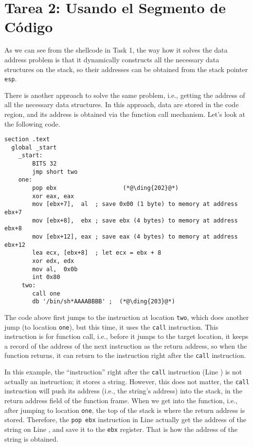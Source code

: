 \section{Tarea 2: Usando el Segmento de Código}

As we can see from the shellcode in Task 1, 
the way how it solves the data address problem is that 
it dynamically constructs all the necessary 
data structures on the stack,
so their addresses can be obtained from the 
stack pointer \texttt{esp}.

There is another approach to solve the same problem,
i.e., getting the address of all the necessary
data structures. In this approach, data are stored in the code
region, and its address is obtained 
via the function call mechanism. Let's look at the following
code. 

\begin{lstlisting}[caption={\texttt{mysh2.s}}]
section .text
  global _start
    _start:
        BITS 32
        jmp short two
    one:
        pop ebx                   (*@\ding{202}@*)
        xor eax, eax
        mov [ebx+7],  al  ; save 0x00 (1 byte) to memory at address ebx+7
        mov [ebx+8],  ebx ; save ebx (4 bytes) to memory at address ebx+8
        mov [ebx+12], eax ; save eax (4 bytes) to memory at address ebx+12
        lea ecx, [ebx+8]  ; let ecx = ebx + 8
        xor edx, edx
        mov al,  0x0b
        int 0x80
     two:
        call one
        db '/bin/sh*AAAABBBB' ;  (*@\ding{203}@*)
\end{lstlisting}

The code above first jumps to the instruction at 
location \texttt{two}, which does another 
jump (to location \texttt{one}), but this time,
it uses the \texttt{call} instruction.  This instruction 
is for function call, i.e., before it jumps to
the target location, it keeps a record of the address
of the next instruction as the return address, so when
the function returns, it can return to the 
instruction right after the \texttt{call} instruction.  

In this example, the ``instruction'' right after the 
\texttt{call} instruction (Line ) is not actually an instruction; 
it stores a string. However, this does not matter, the
\texttt{call} instruction will push its address (i.e.,
the string's address) into the stack, in the return
address field of the function frame. When we 
get into the function, i.e., after jumping to 
location \texttt{one}, the top of the stack 
is where the return address is stored. Therefore,
the \texttt{pop ebx} instruction in Line  actually
get the address of the string on Line , 
and save it to the \texttt{ebx} register. That is how the 
address of the string is obtained. 


